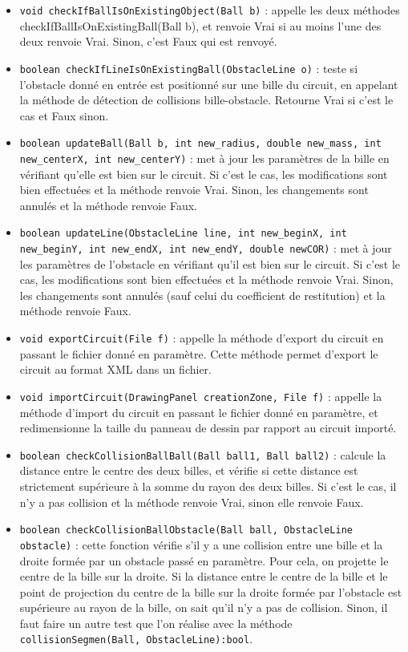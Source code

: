 \documentclass{report}
\begin{document}
\begin{itemize}
\item \texttt{void checkIfBallIsOnExistingObject(Ball b)} : appelle les deux méthodes checkIfBallIsOnExistingBall(Ball b), et renvoie Vrai si au moins l'une des deux renvoie Vrai. Sinon, c'est Faux qui est renvoyé.
\item \texttt{boolean checkIfLineIsOnExistingBall(ObstacleLine o)} : teste si l'obstacle donné en entrée est positionné sur une bille du circuit, en appelant la méthode de détection de collisions bille-obstacle. Retourne Vrai si c'est le cas et Faux sinon.
\item \texttt{boolean updateBall(Ball b, int new\_radius, double new\_mass, int new\_centerX, int new\_centerY)} : met à jour les paramètres de la bille en vérifiant qu'elle est bien sur le circuit. Si c'est le cas, les modifications sont bien effectuées et la méthode renvoie Vrai. Sinon, les changements sont annulés et la méthode renvoie Faux.
\item \texttt{boolean updateLine(ObstacleLine line, int new\_beginX, int new\_beginY, int new\_endX, int new\_endY, double newCOR)} : met à jour les paramètres de l'obstacle en vérifiant qu'il est bien sur le circuit. Si c'est le cas, les modifications sont bien effectuées et la méthode renvoie Vrai. Sinon, les changements sont annulés (sauf celui du coefficient de restitution) et la méthode renvoie Faux.
\item \texttt{void exportCircuit(File f)} : appelle la méthode d'export du circuit en passant le fichier donné en paramètre. Cette méthode permet d'export le circuit au format XML dans un fichier.
\item \texttt{void importCircuit(DrawingPanel creationZone, File f)} : appelle la méthode d'import du circuit en passant le fichier donné en paramètre, et redimensionne la taille du panneau de dessin par rapport au circuit importé.
\item \texttt{boolean checkCollisionBallBall(Ball ball1, Ball ball2)} : calcule la distance entre le centre des deux billes, et vérifie si cette distance est strictement supérieure à la somme du rayon des deux billes. Si c'est le cas, il n'y a pas collision et la méthode renvoie Vrai, sinon elle renvoie Faux.
\item \texttt{boolean checkCollisionBallObstacle(Ball ball, ObstacleLine obstacle)} : cette fonction vérifie s'il y a une collision entre une bille et la droite formée par un obstacle passé en paramètre. Pour cela, on projette le centre de la bille sur la droite. Si la distance entre le centre de la bille et le point de projection du centre de la bille sur la droite formée par l'obstacle est supérieure au  rayon de la bille, on sait qu'il n'y a pas de collision. Sinon, il faut faire un autre test que l'on réalise avec la méthode \texttt{collisionSegmen(Ball, ObstacleLine):bool}.

\end{itemize}
\end{document}
